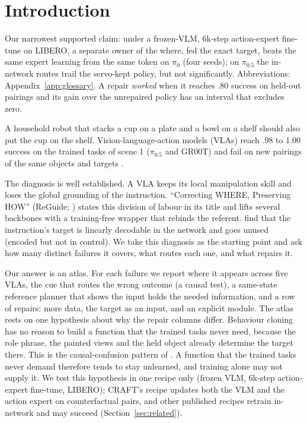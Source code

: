 \documentclass{article}
\newcommand{\pifive}{$\pi_{0.5}$}
\newcommand{\pizero}{$\pi_0$}
\begin{document}
\section{Introduction}
\label{sec:intro}

Our narrowest supported claim: under a frozen-VLM, 6k-step action-expert fine-tune on LIBERO, a separate owner of the where, fed the exact target, beats the same expert learning from the same token on \pizero{} (four seeds); on \pifive{} the in-network routes trail the servo-kept policy, but not significantly. Abbreviations: Appendix~\ref{app:glossary}. A repair \emph{worked} when it reaches .80 success on held-out pairings and its gain over the unrepaired policy has an interval that excludes zero.

A household robot that stacks a cup on a plate and a bowl on a shelf should also put the cup on the shelf. Vision-language-action models (VLAs) reach .98 to 1.00 success on the trained tasks of scene 1 (\pifive{} and GR00T) and fail on new pairings of the same objects and targets \citep{craft2610,liberopro2510,liberocf2602}.

The diagnosis is well established. A VLA keeps its local manipulation skill and loses the global grounding of the instruction. ``Correcting WHERE, Preserving HOW'' (ReGuide; \citealp{reguide2609}) states this division of labour in its title and lifts several backbones with a training-free wrapper that rebinds the referent. \citet{jiang2610} find that the instruction's target is linearly decodable in the network and goes unused (encoded but not in control). We take this diagnosis as the starting point and ask how many distinct failures it covers, what routes each one, and what repairs it.

Our answer is an atlas. For each failure we report where it appears across five VLAs, the cue that routes the wrong outcome (a causal test), a same-state reference planner that shows the input holds the needed information, and a row of repairs: more data, the target as an input, and an explicit module. The atlas rests on one hypothesis about why the repair columns differ. Behaviour cloning has no reason to build a function that the trained tasks never need, because the role phrase, the painted views and the held object already determine the target there. This is the causal-confusion pattern of \citet{dehaan1905}. A function that the trained tasks never demand therefore tends to stay unlearned, and training alone may not supply it. We test this hypothesis in one recipe only (frozen VLM, 6k-step action-expert fine-tune, LIBERO); CRAFT's recipe updates both the VLM and the action expert on counterfactual pairs, and other published recipes retrain in-network and may succeed (Section~\ref{sec:related}).
\end{document}

